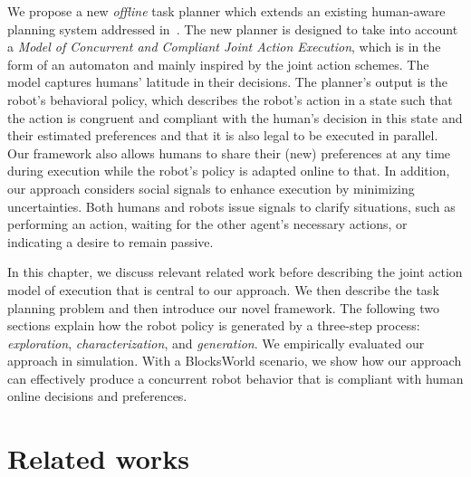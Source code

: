 We propose a new \textit{offline} task planner which extends an existing human-aware planning system addressed in~\cite{buisan_hatpehda_icra}. 
The new planner is designed to take into account a \textit{Model of Concurrent and Compliant Joint Action Execution}, which is in the form of an automaton and mainly inspired by the joint action schemes. 
The model captures humans' latitude in their decisions. 
The planner's output is the robot's behavioral policy, which describes the robot's action in a state such that the action is congruent and compliant with the human's decision in this state and their estimated preferences and that it is also legal to be executed in parallel. 
Our framework also allows humans to share their (new) preferences at any time during execution while the robot's policy is adapted online to that. 
In addition, our approach considers social signals to enhance execution by minimizing uncertainties. Both humans and robots issue signals to clarify situations, such as performing an action, waiting for the other agent's necessary actions, or indicating a desire to remain passive.

In this chapter, we discuss relevant related work before describing the joint action model of execution that is central to our approach. 
We then describe the task planning problem and then introduce our novel framework. 
The following two sections explain how the robot policy is generated by a three-step process: \textit{exploration}, \textit{characterization}, and \textit{generation}. 
We empirically evaluated our approach in simulation. With a BlocksWorld scenario, we show how our approach can effectively produce a concurrent robot behavior that is compliant with human online decisions and preferences.  

\section{Related works}

